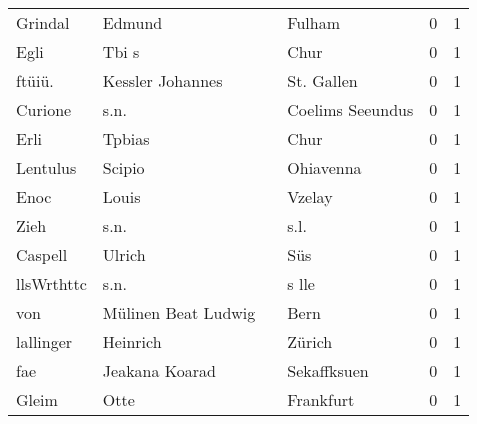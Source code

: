 \begin{center}
\begin{tiny}
\begin{longtabu}{llllrr}
                  Grindal &                             Edmund &             &                                      Fulham &          0 &         1 \\
                     Egli &                              Tbi s &             &                                        Chur &          0 &         1 \\
                   ftüiü. &                   Kessler Johannes &             &                                  St. Gallen &          0 &         1 \\
                  Curione &                               s.n. &             &                            Coelims Seeundus &          0 &         1 \\
                     Erli &                             Tpbias &             &                                        Chur &          0 &         1 \\
                 Lentulus &                             Scipio &             &                                   Ohiavenna &          0 &         1 \\
                     Enoc &                              Louis &             &                                      Vzelay &          0 &         1 \\
                     Zieh &                               s.n. &             &                                        s.l. &          0 &         1 \\
                  Caspell &                             Ulrich &             &                                         Süs &          0 &         1 \\
               llsWrthttc &                               s.n. &             &                                       s lle &          0 &         1 \\
                      von &                Mülinen Beat Ludwig &             &                                        Bern &          0 &         1 \\
                lallinger &                           Heinrich &             &                                      Zürich &          0 &         1 \\
                      fae &                     Jeakana Koarad &             &                                 Sekaffksuen &          0 &         1 \\
                    Gleim &                               Otte &             &                                   Frankfurt &          0 &         1 \\

\end{longtabu}
\end{tiny}
\end{center}
